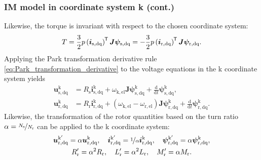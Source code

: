 \begin{frame}
	\frametitle{IM model in coordinate system k (cont.)}
	Likewise, the torque is invariant with respect to the chosen coordinate system:
	\begin{equation}
		T = \frac{3}{2} p \left(\bm{i}_\mathrm{s,dq}\right)^{\mkern-1.5mu\mathsf{T}}\bm{J}\bm{\psi}_\mathrm{s,dq} = -\frac{3}{2} p \left(\bm{i}_\mathrm{r,dq}\right)^{\mkern-1.5mu\mathsf{T}}\bm{J}\bm{\psi}_\mathrm{r,dq}.
	\end{equation}
	\pause
	Applying the Park transformation derivative rule \eqref{eq:Park_transformation_derivative} to the voltage equations in the k coordinate system yields
	\begin{equation}
		\begin{alignedat}{2}
			\bm{u}^\mathrm{k}_\mathrm{s,dq} & = R_\mathrm{s} \bm{i}^\mathrm{k}_\mathrm{s,dq} + \omega_\mathrm{k,el}\bm{J} \bm{\psi}^\mathrm{k}_\mathrm{s,dq} + \frac{\mathrm{d}}{\mathrm{d}t}\bm{\psi}^\mathrm{k}_\mathrm{s,dq},                                 \\
			\bm{u}^\mathrm{k}_\mathrm{r,dq} & = R_\mathrm{r} \bm{i}^\mathrm{k}_\mathrm{r,dq} +\left(\omega_\mathrm{k,el}-\omega_\mathrm{r,el}\right)\bm{J}\bm{\psi}^\mathrm{k}_\mathrm{r,dq} + \frac{\mathrm{d}}{\mathrm{d}t}\bm{\psi}^\mathrm{k}_\mathrm{r,dq}.
		\end{alignedat}
		\label{eq:IM_model_k_voltage_equations}
	\end{equation}
	\pause
	Likewise, the transformation of the rotor quantities based on the turn ratio $\alpha = \nicefrac{N_\mathrm{s}}{N_\mathrm{r}}$ can be applied to the k coordinate system:
	\begin{equation}
		\begin{gathered}
			\bm{u}^{\mathrm{k}'}_\mathrm{r,dq} = \alpha\bm{u}^\mathrm{k}_\mathrm{r,dq}, \quad \bm{i}^{\mathrm{k}'}_\mathrm{r,dq} = \nicefrac{1}{\alpha}\bm{i}^\mathrm{k}_\mathrm{r,dq}, \quad \bm{\psi}^{\mathrm{k}'}_\mathrm{r,dq} = \alpha\bm{\psi}^\mathrm{k}_\mathrm{r,dq},\\
			R'_\mathrm{r} =  \alpha^2 R_\mathrm{r}, \quad L'_\mathrm{r} =  \alpha^2 L_\mathrm{r}, \quad M'_\mathrm{r} =  \alpha M_\mathrm{r}.
		\end{gathered}
		\label{eq:IM_model_k_rotor_quantities_transformed}
	\end{equation}
\end{frame}

